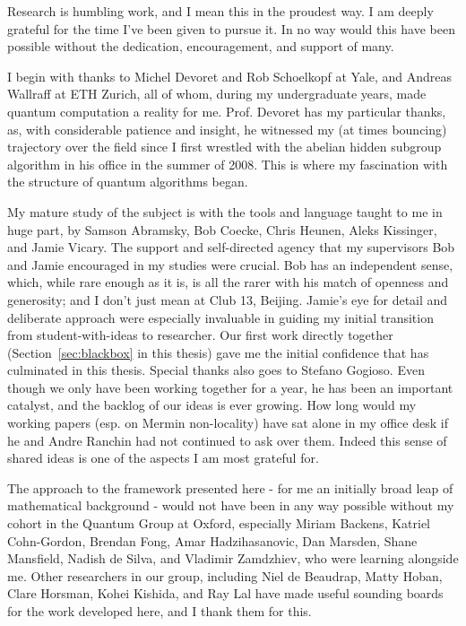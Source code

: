 \begin{acknowledgementslong}
Research is humbling work, and I mean this in the proudest way. I am deeply grateful for the time I've been given to pursue it.  In no way would this have been possible without the dedication, encouragement, and support of many.

I begin with thanks to Michel Devoret and Rob Schoelkopf at Yale, and Andreas Wallraff at ETH Zurich, all of whom, during my undergraduate years, made quantum computation a reality for me.  Prof. Devoret has my particular thanks, as, with considerable patience and insight, he witnessed my (at times bouncing) trajectory over the field since I first wrestled with the abelian hidden subgroup algorithm in his office in the summer of 2008. This is where my fascination with the structure of quantum algorithms began.

My mature study of the subject is with the tools and language taught to me in huge part, by Samson Abramsky, Bob Coecke, Chris Heunen, Aleks Kissinger, and Jamie Vicary. The support and self-directed agency that my supervisors Bob and Jamie encouraged in my studies were crucial. Bob has an independent sense, which, while rare enough as it is, is all the rarer with his match of openness and generosity; and I don't just mean at Club 13, Beijing. Jamie's eye for detail and deliberate approach were especially invaluable in guiding my initial transition from student-with-ideas to researcher. Our first work directly together (Section~\ref{sec:blackbox} in this thesis) gave me the initial confidence that has culminated in this thesis.  Special thanks also goes to Stefano Gogioso. Even though we only have been working together for a year, he has been an important catalyst, and the backlog of our ideas is ever growing.  How long would my working papers (esp. on Mermin non-locality) have sat alone in my office desk if he and Andre Ranchin had not continued to ask over them. Indeed this sense of shared ideas is one of the aspects I am most grateful for. 

The approach to the framework presented here - for me an initially broad leap of mathematical background - would not have been in any way possible without my cohort in the Quantum Group at Oxford, especially Miriam Backens, Katriel Cohn-Gordon, Brendan Fong, Amar Hadzihasanovic, Dan Marsden, Shane Mansfield, Nadish de Silva, and Vladimir Zamdzhiev, who were learning alongside me. Other researchers in our group, including Niel de Beaudrap, Matty Hoban, Clare Horsman, Kohei Kishida, and Ray Lal have made useful sounding boards for the work developed here, and I thank them for this.


\end{acknowledgementslong}
